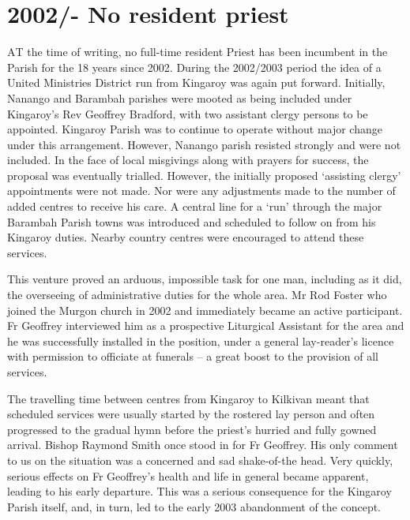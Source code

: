 \section{2002/- No resident priest}



\lettrine[lines=3]{A}{T}
 the time of writing, no full-time resident Priest has been incumbent in the Parish for the 18 years since 2002. During the 2002/2003 period the idea of a United Ministries District run from Kingaroy was again put forward. Initially, Nanango and Barambah parishes were mooted as being included under Kingaroy's Rev Geoffrey Bradford, with two assistant clergy persons to be appointed. Kingaroy Parish was to continue to operate without major change under this arrangement. However, Nanango parish resisted strongly and were not included. In the face of local misgivings along with prayers for success, the proposal was eventually trialled. However, the initially proposed `assisting clergy' appointments were not made. Nor were any adjustments made to the number of added centres to receive his care. A central line for a `run' through the major Barambah Parish towns was introduced and scheduled to follow on from his Kingaroy duties. Nearby country centres were encouraged to attend these services.

This venture proved an arduous, impossible task for one man, including as it did, the overseeing of administrative duties for the whole area. Mr Rod Foster who joined the Murgon church in 2002 and immediately became an active participant. Fr Geoffrey interviewed him as a prospective Liturgical Assistant for the area and he was successfully installed in the position, under a general lay-reader's licence with permission to officiate at funerals -- a great boost to the provision of all services.



The travelling time between centres from Kingaroy to Kilkivan meant that scheduled services were usually started by the rostered lay person and often progressed to the gradual hymn before the priest's hurried and fully gowned arrival. Bishop Raymond Smith once stood in for Fr Geoffrey. His only comment to us on the situation was a concerned and sad shake-of-the head. Very quickly, serious effects on Fr Geoffrey's health and life in general became apparent, leading to his early departure. This was a serious consequence for the Kingaroy Parish itself, and, in turn, led to the early 2003 abandonment of the concept.



